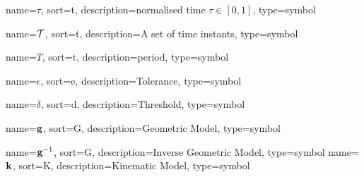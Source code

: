 	{%
		name={\ensuremath{\tau}},
		sort=t,
		description=normalised time \ensuremath{\tau \in [0, 1]},
		type=symbol
	}
	\newcommand{\timenorm}{\gls{sym:timenorm}}

	{%
		name={\ensuremath{\set{T}}},
		sort=t,
		description=A set of time instants,
		type=symbol
	}
	\newcommand{\setoftimeinstants}{\gls{sym:setoftimeinstants}}

	{%
		name={\ensuremath{T}},
		sort=t,
		description=period,
		type=symbol
	}
	\newcommand{\period}{\gls{sym:period}}

	{%
		name={\ensuremath{\epsilon}},
		sort=e,
		description=Tolerance,
		type=symbol
	}
	\newcommand{\tol}{\gls{sym:tolerance}}

	{%
		name={\ensuremath{\delta}},
		sort=d,
		description=Threshold,
		type=symbol
	}
	\newcommand{\threshold}{\gls{sym:threshold}}

	{%
		name={\ensuremath{\vecfunc{g}}},
		sort=G,
		description=Geometric Model,
		type=symbol
	}
	\newcommand{\geometricmodel}{\gls{sym:geometricmodel}}

	{%
		name={\ensuremath{{\vecfunc{g}^{-1}}}},
		sort=G,
		description=Inverse Geometric Model,
		type=symbol
	}
	\newcommand{\invgeometricmodel}{\gls{sym:invgeometricmodel}}
	{%
		name={\ensuremath{\vecfunc{k}}},
		sort=K,
		description=Kinematic Model,
		type=symbol
	}
	\newcommand{\kinematicmodel}{\gls{sym:kinematicmodel}}

